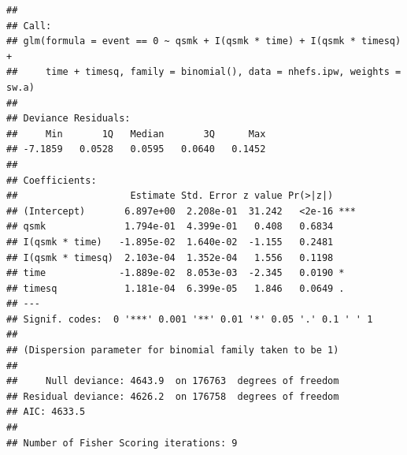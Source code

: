 \documentclass[
  10pt,
]{book}
\begin{document}
\begin{verbatim}
## 
## Call:
## glm(formula = event == 0 ~ qsmk + I(qsmk * time) + I(qsmk * timesq) + 
##     time + timesq, family = binomial(), data = nhefs.ipw, weights = sw.a)
## 
## Deviance Residuals: 
##     Min       1Q   Median       3Q      Max  
## -7.1859   0.0528   0.0595   0.0640   0.1452  
## 
## Coefficients:
##                    Estimate Std. Error z value Pr(>|z|)    
## (Intercept)       6.897e+00  2.208e-01  31.242   <2e-16 ***
## qsmk              1.794e-01  4.399e-01   0.408   0.6834    
## I(qsmk * time)   -1.895e-02  1.640e-02  -1.155   0.2481    
## I(qsmk * timesq)  2.103e-04  1.352e-04   1.556   0.1198    
## time             -1.889e-02  8.053e-03  -2.345   0.0190 *  
## timesq            1.181e-04  6.399e-05   1.846   0.0649 .  
## ---
## Signif. codes:  0 '***' 0.001 '**' 0.01 '*' 0.05 '.' 0.1 ' ' 1
## 
## (Dispersion parameter for binomial family taken to be 1)
## 
##     Null deviance: 4643.9  on 176763  degrees of freedom
## Residual deviance: 4626.2  on 176758  degrees of freedom
## AIC: 4633.5
## 
## Number of Fisher Scoring iterations: 9
\end{verbatim}
\end{document}
